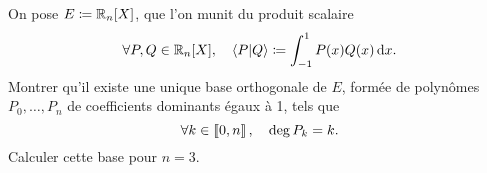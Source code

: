 \documentclass{magnolia}
\begin{document}
\begin{remarques}
\end{remarques}

\begin{exoUnique}
\exo On pose $E\defeq\polyR[n]$, que l'on munit du produit scalaire
  \[\forall P,Q\in\polyR[n]\qsep \ps{P}{Q}\defeq\integ{-1}{1}{P(x)Q(x)}{x}.\]
  Montrer qu'il existe une unique base orthogonale de $E$, formée de
  polynômes $P_0,\ldots,P_n$ de coefficients dominants égaux à 1, tels que
  \[\forall k\in\left\llbracket 0,n\right\rrbracket,\quad \deg P_k=k.\]
  Calculer cette base pour $n=3$.
\end{exoUnique}
\end{document}
